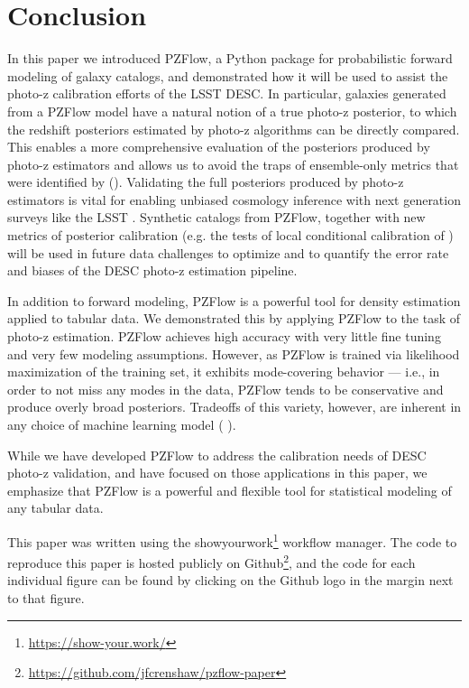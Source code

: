 \documentclass[twocolumn,twocolappendix]{aastex631}
\newcommand{\citePZp}{(\citetalias{schmidt2020} \citeyear{schmidt2020})\xspace}
\newcommand{\citePZt}{\citetalias{schmidt2020} (\citeyear{schmidt2020})\xspace}
\begin{document}
\section{Conclusion}
\label{sec:conclusion}

In this paper we introduced PZFlow, a Python package for probabilistic forward modeling of galaxy catalogs, and demonstrated how it will be used to assist the photo-z calibration efforts of the LSST DESC.
In particular, galaxies generated from a PZFlow model have a natural notion of a true photo-z posterior, to which the redshift posteriors estimated by photo-z algorithms can be directly compared.
This enables a more comprehensive evaluation of the posteriors produced by photo-z estimators and allows us to avoid the traps of ensemble-only metrics that were identified by \citePZt.
Validating the full posteriors produced by photo-z estimators is vital for enabling unbiased cosmology inference with next generation surveys like the LSST \citep{newman2022}.
Synthetic catalogs from PZFlow, together with new metrics of posterior calibration (e.g. the tests of local conditional calibration of \citealt{dey2021b, dey2022}) will be used in future data challenges to optimize and to quantify the error rate and biases of the DESC photo-z estimation pipeline.

In addition to forward modeling, PZFlow is a powerful tool for density estimation applied to tabular data.
We demonstrated this by applying PZFlow to the task of photo-z estimation.
PZFlow achieves high accuracy with very little fine tuning and very few modeling assumptions.
However, as PZFlow is trained via likelihood maximization of the training set, it exhibits mode-covering behavior --- i.e., in order to not miss any modes in the data, PZFlow tends to be conservative and produce overly broad posteriors.
Tradeoffs of this variety, however, are inherent in any choice of machine learning model \citePZp.

While we have developed PZFlow to address the calibration needs of DESC photo-z validation, and have focused on those applications in this paper, we emphasize that PZFlow is a powerful and flexible tool for statistical modeling of any tabular data.

This paper was written using the showyourwork\footnote{\url{https://show-your.work/}} workflow manager.
The code to reproduce this paper is hosted publicly on Github\footnote{\url{https://github.com/jfcrenshaw/pzflow-paper}}, and the code for each individual figure can be found by clicking on the Github logo in the margin next to that figure.
\end{document}
